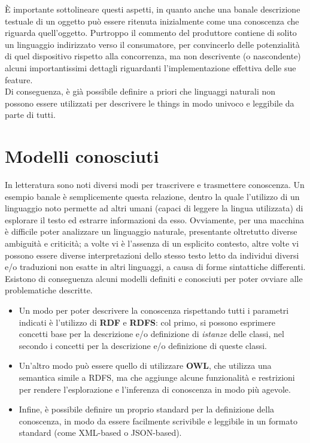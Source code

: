 \documentclass[12pt,a4paper,openright,oneside]{report}
\begin{document}
È importante sottolineare questi aspetti, in quanto anche una banale descrizione testuale di un oggetto può essere ritenuta inizialmente come una conoscenza che riguarda quell'oggetto. Purtroppo il commento del produttore contiene di solito un linguaggio indirizzato verso il consumatore, per convincerlo delle potenzialità di quel dispositivo rispetto alla concorrenza, ma non descrivente (o nascondente) alcuni importantissimi dettagli riguardanti l'implementazione effettiva delle sue feature.\\

Di conseguenza, è già possibile definire a priori che linguaggi naturali non possono essere utilizzati per descrivere le things in modo univoco e leggibile da parte di tutti.

\section{Modelli conosciuti}
In letteratura sono noti diversi modi per trascrivere e trasmettere conoscenza. Un esempio banale è semplicemente questa relazione, dentro la quale l'utilizzo di un linguaggio noto permette ad altri umani (capaci di leggere la lingua utilizzata) di esplorare il testo ed estrarre informazioni da esso. Ovviamente, per una macchina è difficile poter analizzare un linguaggio naturale, presentante oltretutto diverse ambiguità e criticità; a volte vi è l'assenza di un esplicito contesto, altre volte vi possono essere diverse interpretazioni dello stesso testo letto da individui diversi e/o traduzioni non esatte in altri linguaggi, a causa di forme sintattiche differenti.\\

Esistono di conseguenza alcuni modelli definiti e conosciuti per poter ovviare alle problematiche descritte. 

\begin{itemize}
	\item Un modo per poter descrivere la conoscenza rispettando tutti i parametri indicati è l'utilizzo di \textbf{RDF} e \textbf{RDFS}: col primo, si possono esprimere concetti base per la descrizione e/o definizione di \textit{istanze} delle classi, nel secondo i concetti per la descrizione e/o definizione di queste classi.
	
	\item Un'altro modo può essere quello di utilizzare \textbf{OWL}, che utilizza una semantica simile a RDFS, ma che aggiunge alcune funzionalità e restrizioni per rendere l'esplorazione e l'inferenza di conoscenza in modo più agevole.
	
	\item Infine, è possibile definire un proprio standard per la definizione della conoscenza, in modo da essere facilmente scrivibile e leggibile in un formato standard (come XML-based o JSON-based).
\end{itemize}
\end{document}

